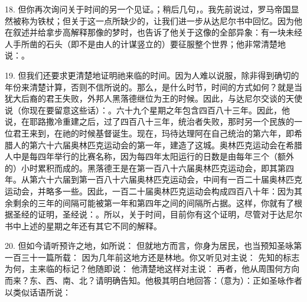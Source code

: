 18. 但你再次询问关于时间的另一个见证。；稍后几句，。我先前说过，罗马帝国显然被称为铁杖；但关于这一点所缺少的，让我们进一步从达尼尔书中回忆。因为他在叙述并给拿步高解释那像的梦时，也告诉了他关于这像的全部异象：有一块未经人手所凿的石头（即不是由人的计谋竖立的）要征服整个世界；他非常清楚地说：。\par

19. 但我们还要求更清楚地证明祂来临的时间。因为人难以说服，除非得到确切的年份来清楚计算，否则不信所说的。那么，是什么时节，时间的方式如何？就是当犹大后裔的君王失败，外邦人黑落德继位为王的时候。因此，与达尼尔交谈的天使说（你现在要留意这些话）：。六十九个星期之年包含四百八十三年。因此，他说，在耶路撒冷重建之后，过了四百八十三年，统治者失败，那时另一个民族的一位君王来到，在祂的时候基督诞生。现在，玛待达理阿在自己统治的第六年，即希腊人的第六十六届奥林匹克运动会的第一年，建造了这城。奥林匹克运动会在希腊人中是每四年举行的比赛名称，因为每四年太阳运行的日数是由每年三个（额外的）小时累积而成的。黑落德王是在第一百八十六届奥林匹克运动会，即其第四年。从第六十六届到第一百八十六届奥林匹克运动会，中间有一百二十届奥林匹克运动会，并略多一些。因此，一百二十届奥林匹克运动会构成四百八十年：因为其余剩余的三年的间隔可能被第一年和第四年之间的间隔所占据。这样，你就有了根据圣经的证明，圣经说：。所以，关于时间，目前你有这个证明，尽管对于达尼尔书中上述的星期之年还有其它不同的解释。\par

20. 但如今请听预许之地，如所说： 但就地方而言，你身为居民，也当预知圣咏第一百三十一篇所载： 因为几年前这地方还是林地。你又听见对主说： 先知的标志为何，主来临的标记？他随即说： 他清楚地这样对主说： 再者，他从周围何方向而来？东、西、南、北？请明确告知。他极其明白地回答：（意为）：正如圣咏作者以类似话语所说：\par


